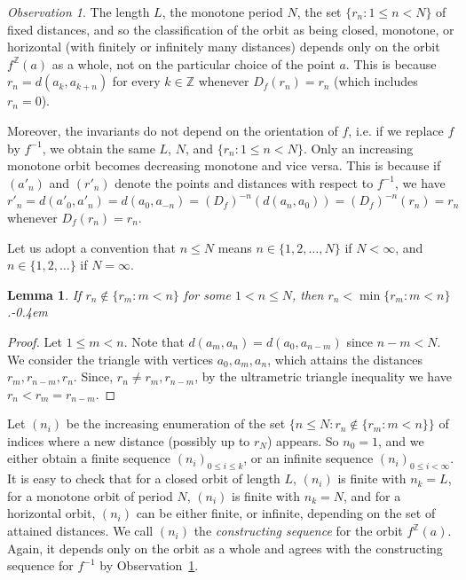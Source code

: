 \documentclass[oneside,notitlepage,12pt]{article}
\newtheorem{lm}[tw]{Lemma}
\theoremstyle{definition}
\theoremstyle{remark}
\newtheorem{observation}[tw]{Observation}
\newcommand \set [1]{\{#1\}}
\newcommand \Z {\mathbb{Z}}
\begin{document}
\begin{observation} \label{obs:invariant}
    The length $L$, the monotone period $N$, the set $\set{r_n: 1 \leq n < N}$ of fixed distances, and so the classification of the orbit as being closed, monotone, or horizontal (with finitely or infinitely many distances) depends only on the orbit $f^\Z(a)$ as a whole, not on the particular choice of the point $a$.
    This is because $r_n = d(a_k, a_{k + n})$ for every $k \in \Z$ whenever $D_f(r_n) = r_n$ (which includes $r_n = 0$).

    Moreover, the invariants do not depend on the orientation of $f$, i.e. if we replace $f$ by $f^{-1}$, we obtain the same $L$, $N$, and $\set{r_n: 1 \leq n < N}$. Only an increasing monotone orbit becomes decreasing monotone and vice versa.
    This is because if $(a'_n)$ and $(r'_n)$ denote the points and distances with respect to $f^{-1}$, we have $r'_n = d(a'_0, a'_n) = d(a_0, a_{-n}) = (D_f)^{-n}(d(a_n, a_0)) = (D_f)^{-n}(r_n) = r_n$ whenever $D_f(r_n) = r_n$.
\end{observation}

Let us adopt a convention that $n \leq N$ means $n \in \set{1, 2, \ldots, N}$ if $N < \infty$, and $n \in \set{1, 2, \ldots}$ if $N = \infty$.

\begin{lm} \label{thm:decreasing_distances}
    If $r_n \notin \set{r_m: m < n}$ for some $1 < n \leq N$, then $r_n < \min\set{r_m: m < n}$.\kern-0.4em
\end{lm}
\begin{proof}
    Let $1 \leq m < n$.
    Note that $d(a_m, a_n) = d(a_0, a_{n - m})$ since $n - m < N$.
    We consider the triangle with vertices $a_0, a_m, a_n$, which attains the distances $r_m, r_{n - m}, r_n$.
    Since, $r_n \neq r_m, r_{n - m}$, by the ultrametric triangle inequality we have $r_n < r_m = r_{n - m}$.
\end{proof}

Let $(n_i)$ be the increasing enumeration of the set $\set{n \leq N: r_n \notin \set{r_m: m < n}}$ of indices where a new distance (possibly up to $r_N$) appears.
So $n_0 = 1$, and we either obtain a finite sequence $(n_i)_{0 \leq i \leq k}$, or an infinite sequence $(n_i)_{0 \leq i < \infty}$.
It is easy to check that 
for a closed orbit of length $L$, $(n_i)$ is finite with $n_k = L$,
for a monotone orbit of period $N$, $(n_i)$ is finite with $n_k = N$, and
for a horizontal orbit, $(n_i)$ can be either finite, or infinite, depending on the set of attained distances.
We call $(n_i)$ the \emph{constructing sequence} for the orbit $f^\Z(a)$.
Again, it depends only on the orbit as a whole and agrees with the constructing sequence for $f^{-1}$ by Observation~\ref{obs:invariant}.
\end{document}
